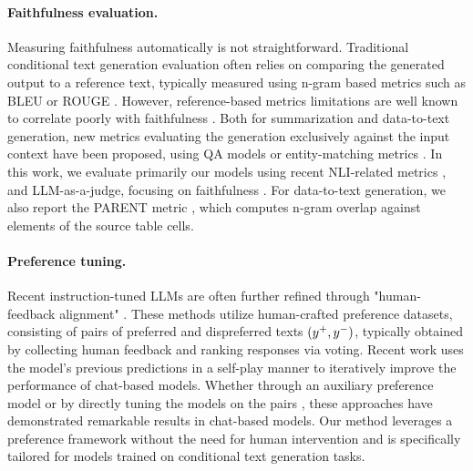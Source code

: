 \paragraph{Faithfulness evaluation.} Measuring faithfulness automatically is not straightforward. Traditional conditional text generation evaluation often relies on comparing the generated output to a reference text, typically measured using n-gram based metrics such as BLEU \citep{papineni-bleu} or ROUGE \citep{lin-2004-rouge}. However, reference-based metrics limitations are well known to correlate poorly with faithfulness \citep{fabbri-etal-2021-summeval,gabriel-etal-2021-go}. Both for summarization and data-to-text generation, new metrics evaluating the generation exclusively against the input context have been proposed, using QA models \citep{rebuffel-etal-2021-data,scialom-etal-2021-questeval} or entity-matching metrics \citep{nan-etal-2021-entity}. In this work, we evaluate primarily our models using recent NLI-related metrics \citep{alignscore, nli-d2t}, and LLM-as-a-judge, focusing on faithfulness \citep{gpt-chiang,gpt-gilardi}. For data-to-text generation, we also report the PARENT metric \citep{parent}, which computes n-gram overlap against elements of the source table cells.


\paragraph{Preference tuning.} Recent instruction-tuned LLMs are often further refined through "human-feedback alignment" \citep{oaif}. These methods utilize human-crafted preference datasets, consisting of pairs of preferred and dispreferred texts $(y^+, y^-)$, typically obtained by collecting human feedback and ranking responses via voting. Recent work \citep{spin} uses the model's previous predictions in a self-play manner to iteratively improve the performance of chat-based models. Whether through an auxiliary preference model \citep{rlhf} or by directly tuning the models on the pairs \citep{dpo}, these approaches have demonstrated remarkable results in chat-based models. Our method leverages a preference framework without the need for human intervention and is specifically tailored for models trained on conditional text generation tasks.

